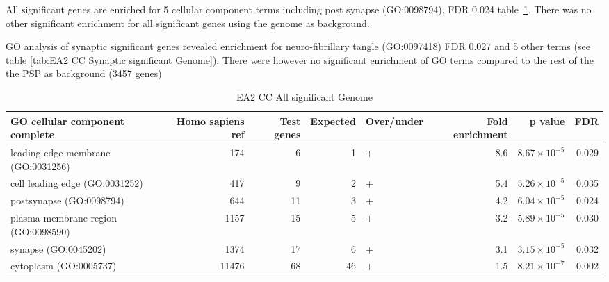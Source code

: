 All significant genes are enriched for 5 cellular component terms including post synapse (GO:0098794), FDR 0.024 table~\ref{tab:EA2 CC All significant Genome}.
There was no other significant enrichment for all significant genes using the genome as background.

GO analysis of synaptic significant genes revealed enrichment for neuro-fibrillary tangle (GO:0097418) FDR 0.027 and 5 other terms (see table \ref{tab:EA2 CC Synaptic significant Genome}). There were however no significant enrichment of GO terms compared to the rest of the the PSP as background (3457 genes)

\begin{table}[ht]
\centering
\begin{adjustbox}{width=\textwidth}
\begin{tabular}{lrrrlrrr}
  \hline
GO cellular component complete & Homo sapiens ref & Test genes & Expected & Over/under & Fold enrichment & p value & FDR \\ 
  \hline
leading edge membrane (GO:0031256) & 174 & 6 & 1 & + & 8.6 & $8.67 \times 10^{-5}$ & 0.029 \\ 
  cell leading edge (GO:0031252) & 417 & 9 & 2 & + & 5.4 & $5.26 \times 10^{-5}$ & 0.035 \\ 
  postsynapse (GO:0098794) & 644 & 11 & 3 & + & 4.2 & $6.04 \times 10^{-5}$ & 0.024 \\ 
  plasma membrane region (GO:0098590) & 1157 & 15 & 5 & + & 3.2 & $5.89 \times 10^{-5}$ & 0.030 \\ 
  synapse (GO:0045202) & 1374 & 17 & 6 & + & 3.1 & $3.15 \times 10^{-5}$ & 0.032 \\ 
  cytoplasm (GO:0005737) & 11476 & 68 & 46 & + & 1.5 & $8.21 \times 10^{-7}$ & 0.002 \\ 
   \hline
\end{tabular}
\end{adjustbox}
\caption{EA2 CC All significant Genome} 
\label{tab:EA2 CC All significant Genome}
\end{table}

